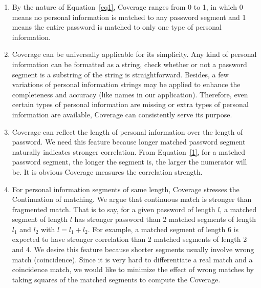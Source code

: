 \documentclass{sig-alternate}
\begin{document}
\begin{enumerate}[leftmargin=*]
\item By the nature of Equation~\ref{eq1}, Coverage ranges from 0 to 1, in which 0 means no personal information is matched to any password segment and 1 means the entire password is matched to only one type of personal information. 
\item Coverage can be universally applicable for its simplicity. Any kind of personal information can be formatted as a string, check whether or not a password segment is a substring of the string is straightforward. Besides, a few variations of personal information strings may be applied to enhance the completeness and accuracy (like names in our application). Therefore, even certain types of personal information are missing or extra types of personal information are available, Coverage can consistently serve its purpose.
\item Coverage can reflect the length of personal information over the length of password. We need this feature because longer matched password segment naturally indicates stronger correlation. From Equation~\ref{1}, for a matched password segment, the longer the segment is, the larger the numerator will be. It is obvious Coverage measures the correlation strength. \item For personal information segments of same length, Coverage stresses the Continuation of matching. We argue that continuous match is stronger than fragmented match. That is to say, for a given password of length $l$, a matched segment of length $l$ has stronger password than 2 matched segments of length $l_1$ and $l_2$ with $l = l_1 + l_2$. For example, a matched segment of length 6 is expected to have stronger correlation than 2 matched segments of length 2 and 4. We desire this feature because shorter segments usually involve wrong match (coincidence). Since it is very hard to differentiate a real match and a coincidence match, we would like to minimize the effect of wrong matches by taking squares of the matched segments to compute the Coverage.
\end{enumerate}
\end{document}
